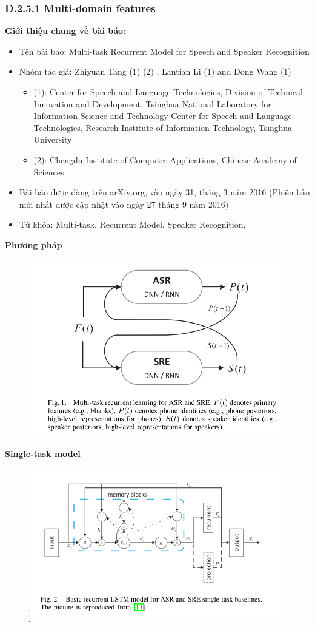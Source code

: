 \documentclass{article}
\begin{document}
	\subsubsection{D.2.5.1 Multi-domain features}
	\textbf{Giới thiệu chung về bài báo:}
	\begin{itemize}
		\item Tên bài báo: Multi-task Recurrent Model for Speech and Speaker Recognition
		\item Nhóm tác giả: Zhiyuan Tang (1) (2) , Lantian Li (1) and Dong Wang (1)
		\begin{itemize}
			\item (1): Center for Speech and Language Technologies, Division of Technical Innovation and Development,
			Tsinghua National Laboratory for Information Science and Technology
			Center for Speech and Language Technologies, Research Institute of Information Technology, Tsinghua University
			\item (2): Chengdu Institute of Computer Applications, Chinese Academy of Sciences
		\end{itemize}
		\item Bài báo được đăng trên arXiv.org, vào ngày 31, tháng 3 năm 2016 (Phiên bản mới nhất được cập nhật vào ngày 27 tháng 9 năm 2016)
		\item Từ khóa: Multi-task, Recurrent Model, Speaker Recognition, 
	\end{itemize}
	\textbf{Phương pháp}
	\begin{figure}[H]
		\centering
		\includegraphics[width=0.75\linewidth]{images/multi-task-recurrent-learning.png}
		\label{fig:writing-thesis}
	\end{figure}
	\textbf{Single-task model}
	\begin{figure}[H]
		\centering
		\includegraphics[width=0.75\linewidth]{images/basis-single-task-model.png}
		\label{fig:writing-thesis}
	\end{figure}
\end{document}
